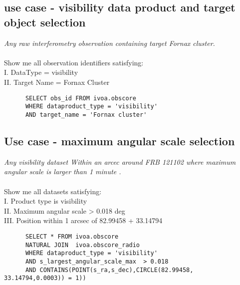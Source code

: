 
\subsection{ use case - visibility data product and target object selection }
\textit{Any raw interferometry observation containing target Fornax cluster.}\\
\\
Show me all  observation identifiers satisfying:\\
I. DataType = visibility \\
II. Target Name = Fornax Cluster \\
\begin{verbatim}
      SELECT obs_id FROM ivoa.obscore
      WHERE dataproduct_type = 'visibility' 
      AND target_name = 'Fornax cluster'
\end{verbatim}

\subsection{Use case - maximum angular scale selection}
\textit{Any visibility dataset Within an arcec around FRB 121102  where  maximum angular scale is larger than 1 minute .}\\ \\
Show me all datasets satisfying:\\
I. Product type is visibility \\
II. Maximum angular scale  >  0.018 deg \\
III. Position within 1 arcsec of 82.99458 + 33.14794
\begin{verbatim}
      SELECT * FROM ivoa.obscore 
      NATURAL JOIN  ivoa.obscore_radio
      WHERE dataproduct_type = 'visibility' 
      AND s_largest_angular_scale_max  > 0.018 
      AND CONTAINS(POINT(s_ra,s_dec),CIRCLE(82.99458, 33.14794,0.0003)) = 1))
\end{verbatim}

